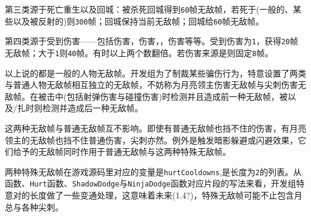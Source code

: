 第三类源于死亡重生以及回城：被杀死回城得到\lstinline{60}帧无敌帧，若死于(一般的、某些以及被反射的)则\lstinline{300}帧；回城保持当前无敌帧；回城给\lstinline{60}帧无敌帧。

第四类源于受到伤害——包括伤害，伤害，，伤害等等。受到伤害为\lstinline{1}，获得\lstinline{20}帧无敌帧；大于\lstinline{1}则\lstinline{40}帧。有时以上两个数翻倍。若伤害来源是则固定\lstinline{8}帧。

以上说的都是一般的人物无敌帧。开发组为了制裁某些骗伤行为，特意设置了两类与普通人物无敌帧相互独立的无敌帧，不妨称为月亮领主伤害无敌帧与尖刺伤害无敌帧。在被击中(包括射弹伤害与碰撞伤害)时检测并且造成前一种无敌帧，被以及/扎时则检测并造成后一种无敌帧。

这两种无敌帧与普通无敌帧互不影响。即使有普通无敌帧也挡不住的伤害，有月亮领主的无敌帧也挡不住普通伤害，尖刺亦然。例外是触发暗影躲避或闪避效果，它们给予的无敌帧同时作用于普通无敌帧与这两种特殊无敌帧。

两种特殊无敌帧在游戏源码里对应的变量是\lstinline{hurtCooldowns},是长度为\lstinline{2}的列表。从函数、\lstinline{Hurt}函数、\lstinline{ShadowDodge}与\lstinline{NinjaDodge}函数对应片段的写法来看，开发组特意对的长度做了一些变通处理，这意味着未来(1.4?)，特殊无敌帧可能不止包含月总与各种尖刺。
